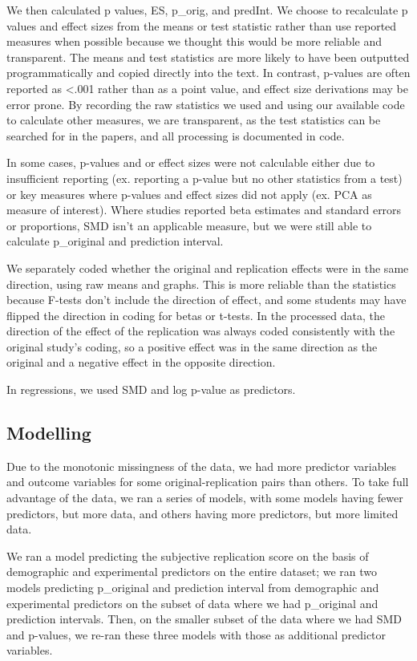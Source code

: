 \documentclass[
  english,
  a4paper,
]{article}
\begin{document}
We then calculated p values, ES, p\_orig, and predInt. We choose to recalculate p values and effect sizes from the means or test statistic rather than use reported measures when possible because we thought this would be more reliable and transparent. The means and test statistics are more likely to have been outputted programmatically and copied directly into the text. In contrast, p-values are often reported as \textless.001 rather than as a point value, and effect size derivations may be error prone. By recording the raw statistics we used and using our available code to calculate other measures, we are transparent, as the test statistics can be searched for in the papers, and all processing is documented in code.

In some cases, p-values and or effect sizes were not calculable either due to insufficient reporting (ex. reporting a p-value but no other statistics from a test) or key measures where p-values and effect sizes did not apply (ex. PCA as measure of interest). Where studies reported beta estimates and standard errors or proportions, SMD isn't an applicable measure, but we were still able to calculate p\_original and prediction interval.

We separately coded whether the original and replication effects were in the same direction, using raw means and graphs. This is more reliable than the statistics because F-tests don't include the direction of effect, and some students may have flipped the direction in coding for betas or t-tests. In the processed data, the direction of the effect of the replication was always coded consistently with the original study's coding, so a positive effect was in the same direction as the original and a negative effect in the opposite direction.

In regressions, we used SMD and log p-value as predictors.

\hypertarget{modelling}{%
\subsection{Modelling}\label{modelling}}

Due to the monotonic missingness of the data, we had more predictor variables and outcome variables for some original-replication pairs than others. To take full advantage of the data, we ran a series of models, with some models having fewer predictors, but more data, and others having more predictors, but more limited data.

We ran a model predicting the subjective replication score on the basis of demographic and experimental predictors on the entire dataset; we ran two models predicting p\_original and prediction interval from demographic and experimental predictors on the subset of data where we had p\_original and prediction intervals. Then, on the smaller subset of the data where we had SMD and p-values, we re-ran these three models with those as additional predictor variables.
\end{document}
